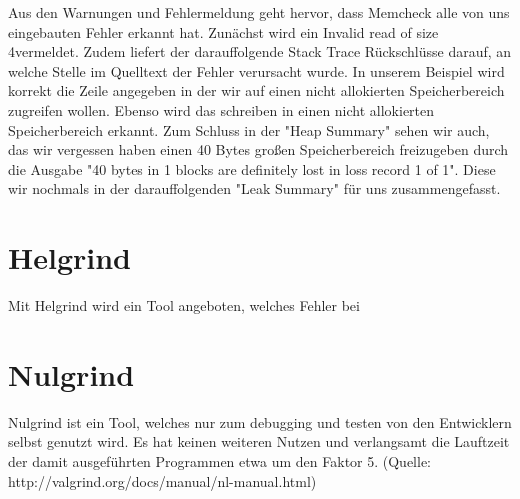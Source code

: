 Aus den Warnungen und Fehlermeldung geht hervor, dass Memcheck alle von uns eingebauten Fehler erkannt hat. Zunächst wird ein \glqq Invalid read of size 4\grqq  vermeldet. Zudem liefert der darauffolgende Stack Trace Rückschlüsse darauf, an welche Stelle im Quelltext der Fehler verursacht wurde. In unserem Beispiel wird korrekt die Zeile angegeben in der wir auf einen nicht allokierten Speicherbereich zugreifen wollen. Ebenso wird das schreiben in einen nicht allokierten Speicherbereich erkannt. Zum Schluss in der "Heap Summary" sehen wir auch, das wir vergessen haben einen 40 Bytes großen Speicherbereich freizugeben durch die Ausgabe "40 bytes in 1 blocks are definitely lost in loss record 1 of 1". Diese wir nochmals in der darauffolgenden "Leak Summary" für uns zusammengefasst.

\section{Helgrind}
Mit Helgrind wird ein Tool angeboten, welches Fehler bei 

\section{Nulgrind}
Nulgrind ist ein Tool, welches nur zum debugging und testen von den Entwicklern selbst genutzt wird. Es hat keinen weiteren Nutzen und verlangsamt die Lauftzeit der damit ausgeführten Programmen etwa um den Faktor 5. (Quelle: http://valgrind.org/docs/manual/nl-manual.html)